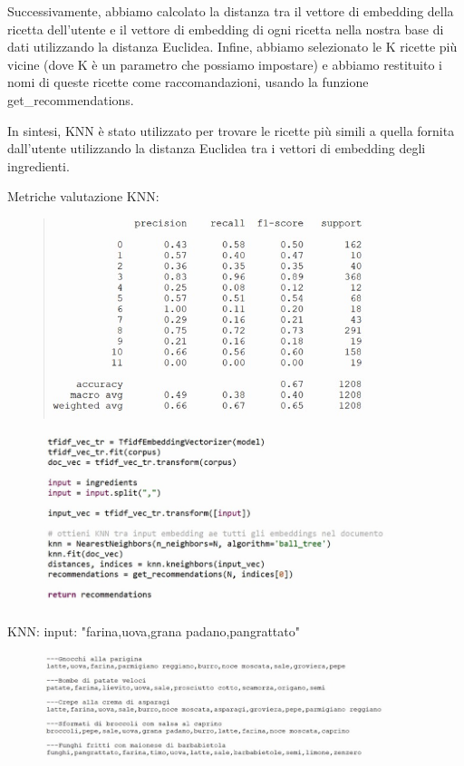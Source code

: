 \documentclass[12pt]{report}
\begin{document}
Successivamente, abbiamo calcolato la distanza tra il vettore di embedding della ricetta dell'utente e il vettore di embedding di ogni ricetta nella nostra base di dati utilizzando la distanza Euclidea. Infine, abbiamo selezionato le K ricette più vicine (dove K è un parametro che possiamo impostare) e abbiamo restituito i nomi di queste ricette come raccomandazioni, usando la funzione get\_recommendations.

In sintesi, KNN è stato utilizzato per trovare le ricette più simili a quella fornita dall'utente utilizzando la distanza Euclidea tra i vettori di embedding degli ingredienti.

Metriche valutazione KNN:

\begin{figure}[H]
        \centering
        {\includegraphics[width=0.9\textwidth]{img/img21.jpg}}
\end{figure}

\begin{figure}[H]
        \centering
        {\includegraphics[width=0.9\textwidth]{img/img17.jpg}}
\end{figure}

KNN: input: "farina,uova,grana padano,pangrattato"

\begin{figure}[H]
        \centering
        {\includegraphics[width=0.9\textwidth]{img/img18.jpg}}
\end{figure}
\end{document}
